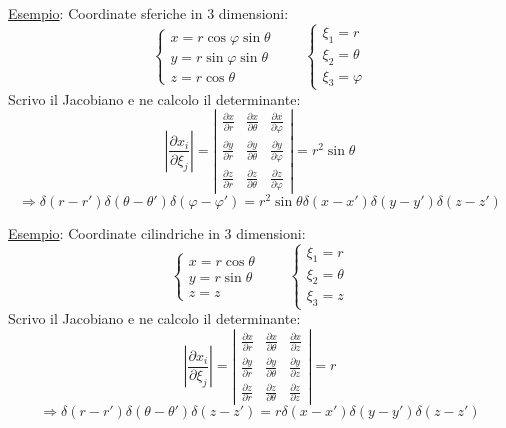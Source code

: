 \documentclass[a4paper,11pt]{report}
\begin{document}
\underline{Esempio}: Coordinate sferiche in 3 dimensioni:
\[
\begin{cases}
x=r\cos\varphi\sin\theta \\
y=r\sin\varphi\sin\theta \\
z=r\cos\theta
\end{cases}
\qquad
\begin{cases}
\xi_1=r \\
\xi_2=\theta \\
\xi_3=\varphi
\end{cases}
\]
Scrivo il Jacobiano e ne calcolo il determinante:
\[
\left|\frac{\partial x_i}{\partial \xi_j}\right|=\left|\begin{matrix}
\frac{\partial x}{\partial r} & \frac{\partial x}{\partial \theta} & \frac{\partial x}{\partial \varphi} \\
\frac{\partial y}{\partial r} & \frac{\partial y}{\partial \theta} & \frac{\partial y}{\partial \varphi}\\
\frac{\partial z}{\partial r} & \frac{\partial z}{\partial \theta} & \frac{\partial z}{\partial \varphi}
\end{matrix}\right|=r^2\sin\theta
\]
\begin{equation}
\Rightarrow \delta(r-r')\delta(\theta - \theta')\delta(\varphi - \varphi') = r^2\sin\theta \delta(x-x')\delta(y-y')\delta(z-z')
\end{equation}

\underline{Esempio}: Coordinate cilindriche in 3 dimensioni:
\[
\begin{cases}
x=r\cos\theta \\
y=r\sin\theta \\
z=z
\end{cases}
\qquad
\begin{cases}
\xi_1=r \\
\xi_2=\theta \\
\xi_3=z
\end{cases}
\]
Scrivo il Jacobiano e ne calcolo il determinante:
\[
\left|\frac{\partial x_i}{\partial \xi_j}\right|=\left|\begin{matrix}
\frac{\partial x}{\partial r} & \frac{\partial x}{\partial \theta} & \frac{\partial x}{\partial z} \\
\frac{\partial y}{\partial r} & \frac{\partial y}{\partial \theta} & \frac{\partial y}{\partial z}\\
\frac{\partial z}{\partial r} & \frac{\partial z}{\partial \theta} & \frac{\partial z}{\partial z}
\end{matrix}\right|=r
\]
\[
\Rightarrow \delta(r-r')\delta(\theta - \theta')\delta(z - z') = r \delta(x-x')\delta(y-y')\delta(z-z')
\]
\end{document}
